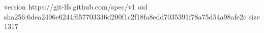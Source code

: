 version https://git-lfs.github.com/spec/v1
oid sha256:6dea2496e6244f657703336d200f1c2f18fa8edd7035391f78a75d54a98afe2c
size 1317
